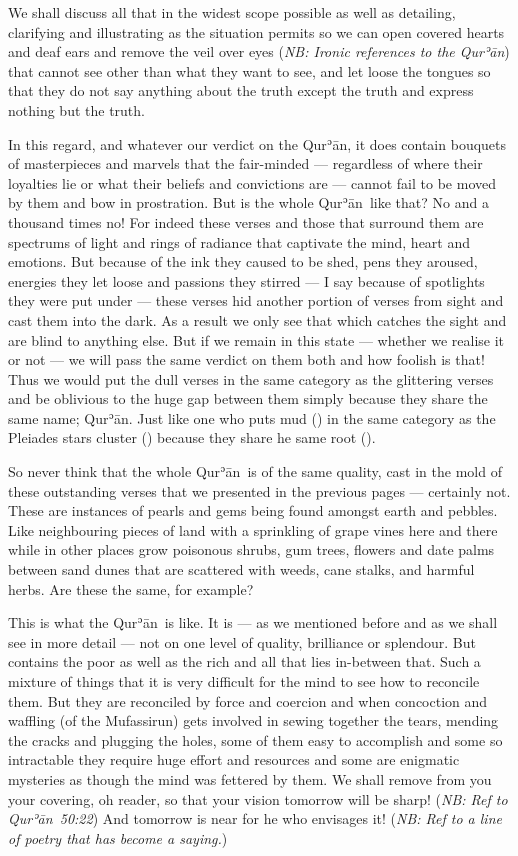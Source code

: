 \documentclass[12pt]{memoir}
\def\´{ʾ} %
\newcommand{\ar}[1]{\RL{\arabicfont#1}}
\def \Quran{Qur\-\´ān} %
\def\–{-\hskip0pt}
\newcommand{\QRef}[1]{{\color{darkblue}#1}}
\newcommand{\NB}[1]{\emph{\small NB: #1}}
\begin{document}
We shall discuss all that in the widest scope possible as well as detailing,
clarifying and illustrating as the situation permits so we can open
covered hearts and deaf ears and remove the veil over eyes
(\NB{Ironic references to the \Quran})
that cannot see other than what they want to see, and let loose the tongues
so that they do not say anything about the truth
except the truth and express nothing but the truth.

In this regard, and whatever our verdict on the \Quran,
it does contain bouquets of masterpieces and marvels that the fair\–minded —
regardless of where their loyalties lie or
what their beliefs and convictions are —
cannot fail to be moved by them and bow in prostration.
But is the whole \Quran\ like that?
No and a thousand times no!
For indeed these verses and those that surround them
are spectrums of light and rings of radiance
that captivate the mind, heart and emotions.
But because of the ink they caused to be shed, pens they aroused,
energies they let loose and passions they stirred —
I say because of spotlights they were put under —
these verses hid another portion of verses from sight
and cast them into the dark.
As a result we only see that which catches the sight
and are blind to anything else.
But if we remain in this state — whether we realise it or not —
we will pass the same verdict on them both and how foolish is that!
Thus we would put the dull verses in the same category as the glittering verses
and be oblivious to the huge gap between them
simply because they share the same name; \Quran.
Just like one who puts mud (\ar{الثرى}) in the same category
as the Pleiades stars cluster (\ar{الثريا})
because they share he same root (\ar{ث ر ي}).

So never think that the whole \Quran\ is of the same quality,
cast in the mold of these outstanding verses
that we presented in the previous pages — certainly not.
These are instances of pearls and gems being found amongst earth and pebbles.
Like neighbouring pieces of land with a sprinkling of grape vines here
and there while in other places grow poisonous shrubs, gum trees,
flowers and date palms between sand dunes that are scattered
with weeds, cane stalks, and harmful herbs.
Are these the same, for example?

This is what the \Quran\ is like.
It is — as we mentioned before and as we shall see in more detail —
not on one level of quality, brilliance or splendour.
But contains the poor as well as the rich and all that lies in\–between that.
Such a mixture of things that it is very difficult
for the mind to see how to reconcile them.
But they are reconciled by force and coercion
and when concoction and waffling (of the Mufassirun)
gets involved in sewing together the tears,
mending the cracks and plugging the holes,
some of them easy to accomplish and some so intractable
they require huge effort and resources and some are enigmatic mysteries
as though the mind was fettered by them.
We shall remove from you your covering, oh reader,
so that your vision tomorrow will be sharp!
(\NB{Ref to \Quran\ \QRef{50:22}})
And tomorrow is near for he who envisages it!
(\NB{Ref to a line of poetry that has become a saying.})
\end{document}
